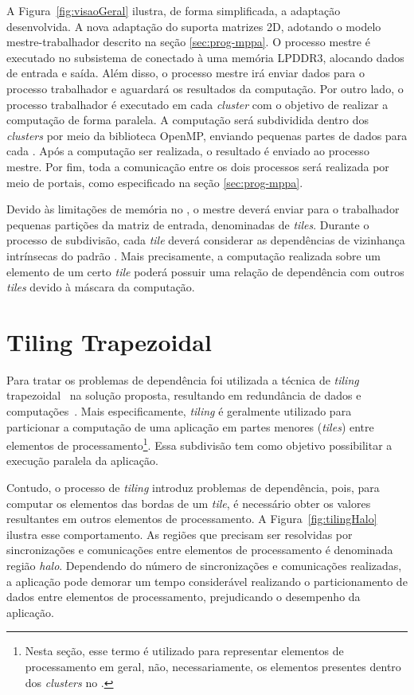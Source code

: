 A Figura~\ref{fig:visaoGeral} ilustra, de forma simplificada, a adaptação
desenvolvida. A nova adaptação do \fw suporta matrizes \stencil 2D, adotando o modelo
mestre-trabalhador descrito na seção \ref{sec:prog-mppa}. O processo mestre é
executado no subsistema de \es conectado à uma memória LPDDR3, alocando dados de
entrada e saída. Além disso, o processo mestre irá enviar dados para o processo
trabalhador e aguardará os resultados da computação. Por outro lado, o processo
trabalhador é executado em cada \textit{cluster} com o objetivo de realizar a
computação \stencil de forma paralela. A computação será subdividida dentro dos
\textit{clusters} por meio da biblioteca OpenMP, enviando pequenas partes de
dados para cada \pe. Após a computação ser realizada, o resultado é enviado ao
processo mestre. Por fim, toda a comunicação entre os dois processos será
realizada por meio de portais, como especificado na seção \ref{sec:prog-mppa}.

Devido às limitações de memória no \mppa, o mestre deverá enviar para o
trabalhador pequenas partições da matriz de entrada, denominadas de
\textit{tiles}. Durante o processo de subdivisão, cada \textit{tile} deverá
considerar as dependências de vizinhança intrínsecas do padrão \stencil. Mais
precisamente, a computação realizada sobre um elemento de um certo \textit{tile}
poderá possuir uma relação de dependência com outros \textit{tiles} devido à
máscara da computação.


\section{Tiling Trapezoidal}
\label{sec:tiling}
Para tratar os problemas de dependência foi utilizada a técnica de
\textit{tiling} trapezoidal~\cite{meng11} na solução proposta, resultando em redundância de
dados e computações~\cite{rocha17}. Mais especificamente, \textit{tiling} é
geralmente utilizado para particionar a computação de uma aplicação \stencil em
partes menores (\textit{tiles}) entre elementos de processamento\footnote{Nesta
seção, esse termo é utilizado para representar elementos de processamento em
geral, não, necessariamente, os elementos presentes dentro dos \textit{clusters}
no \mppa.}. Essa subdivisão tem como objetivo possibilitar a execução paralela da aplicação.

Contudo, o processo de \textit{tiling} introduz problemas de dependência, pois,
para computar os elementos das bordas de um \textit{tile}, é necessário obter
os valores resultantes em outros elementos de processamento. A Figura~\ref{fig:tilingHalo} ilustra
esse comportamento. As regiões que precisam ser resolvidas por sincronizações e
comunicações entre elementos de processamento é denominada região \textit{halo}. Dependendo do número
de sincronizações e comunicações realizadas, a aplicação pode demorar um tempo
considerável realizando o particionamento de dados entre elementos de
processamento, prejudicando o desempenho da aplicação.


